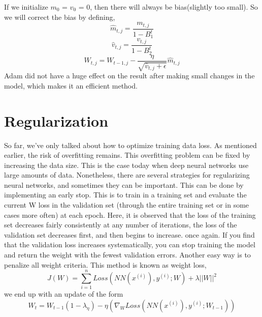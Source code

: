 If we initialize $m_0$ = $v_0$ = 0, then there will always be bias(slightly too small). So we will correct the bias by defining,
\begin{equation*}
    \hat{m}_{t,j} = \frac{m_{t,j}}{1-B_1^t}
\end{equation*}
\begin{equation*}
    \hat{v}_{t,j} = \frac{v_{t,j}}{1-B_2^t}
\end{equation*}
\begin{equation*}
    W_{t,j} = W_{t-1, j} - \frac{\eta}{\sqrt{ \hat{v}_{t,j}+\epsilon}}\hat{m}_{t,j} 
\end{equation*}
Adam did not have a huge effect on the result after making small changes in the model, which makes it an efficient method.
\section{Regularization}
So far, we've only talked about how to optimize  training data loss. As mentioned earlier, the risk of overfitting remains. This overfitting problem can be fixed by increasing the  data size. This is the case today when deep neural networks use large amounts of data. Nonetheless, there are several strategies for regularizing  neural networks, and sometimes they can be important. This can be done by implementing an early stop. This is to train in a training set and  evaluate  the current W loss in the validation set (through the entire training set or in some cases more often) at each epoch. Here, it is observed that the loss of the training set decreases fairly consistently at any number of iterations, the loss of the validation set decreases first, and then begins to increase. 
 once again. If you find that the validation loss increases systematically, you can stop training the model and return the weight with the fewest validation errors. Another easy way is to penalize  all weight criteria. This method is known as weight loss,
\begin{equation*}
    J(W) = \sum_{i=1}^n Loss(NN(x^{(i)}), y^{(i)};W) + \lambda ||W||^2
\end{equation*}
we end up with an update of the form
\begin{equation*}
    W_t = W_{t-1}(1-\lambda_\eta) - \eta (\nabla_W Loss(NN(x^{(i)}), y^{(i)};W_{t-1}))
\end{equation*}

